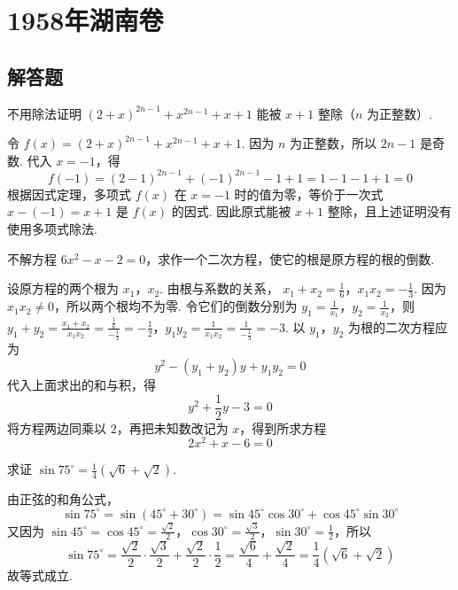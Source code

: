 \chapter{1958年湖南卷}

\section{解答题}

\begin{problem}
不用除法证明 \(\left(2+x\right)^{2n-1}+x^{2n-1}+x+1\) 能被 \(x+1\) 整除（\(n\) 为正整数）.
\end{problem}

\begin{solution}
令 \(f(x)=\left(2+x\right)^{2n-1}+x^{2n-1}+x+1\). 因为 \(n\) 为正整数，所以 \(2n-1\) 是奇数. 代入 \(x=-1\)，得
\[
f(-1)=\left(2-1\right)^{2n-1}+\left(-1\right)^{2n-1}-1+1=1-1-1+1=0
\]
根据因式定理，多项式 \(f(x)\) 在 \(x=-1\) 时的值为零，等价于一次式 \(x-(-1)=x+1\) 是 \(f(x)\) 的因式. 因此原式能被 \(x+1\) 整除，且上述证明没有使用多项式除法.
\end{solution}

\begin{problem}
不解方程 \(6x^{2}-x-2=0\)，求作一个二次方程，使它的根是原方程的根的倒数.
\end{problem}

\begin{solution}
设原方程的两个根为 \(x_{1}\)，\(x_{2}\). 由根与系数的关系，
\(x_{1}+x_{2}=\frac{1}{6}\)，\(x_{1}x_{2}=-\frac{1}{3}\).
因为 \(x_{1}x_{2}\ne0\)，所以两个根均不为零. 令它们的倒数分别为 \(y_{1}=\frac{1}{x_{1}}\)，\(y_{2}=\frac{1}{x_{2}}\)，则
\(y_{1}+y_{2}=\frac{x_{1}+x_{2}}{x_{1}x_{2}}=\frac{\frac{1}{6}}{-\frac{1}{3}}=-\frac{1}{2}\)，\(y_{1}y_{2}=\frac{1}{x_{1}x_{2}}=\frac{1}{-\frac{1}{3}}=-3\).
以 \(y_{1}\)，\(y_{2}\) 为根的二次方程应为
\[
y^{2}-\left(y_{1}+y_{2}\right)y+y_{1}y_{2}=0
\]
代入上面求出的和与积，得
\[
y^{2}+\frac{1}{2}y-3=0
\]
将方程两边同乘以 \(2\)，再把未知数改记为 \(x\)，得到所求方程
\[
2x^{2}+x-6=0
\]
\end{solution}

\begin{problem}
求证 \(\sin75^{\circ}=\frac{1}{4}\left(\sqrt{6}+\sqrt{2}\right)\).
\end{problem}

\begin{solution}
由正弦的和角公式，
\[
\sin75^{\circ}=\sin\left(45^{\circ}+30^{\circ}\right)=\sin45^{\circ}\cos30^{\circ}+\cos45^{\circ}\sin30^{\circ}
\]
又因为 \(\sin45^{\circ}=\cos45^{\circ}=\frac{\sqrt{2}}{2}\)，\(\cos30^{\circ}=\frac{\sqrt{3}}{2}\)，\(\sin30^{\circ}=\frac{1}{2}\)，所以
\[
\sin75^{\circ}=\frac{\sqrt{2}}{2}\cdot\frac{\sqrt{3}}{2}+\frac{\sqrt{2}}{2}\cdot\frac{1}{2}=\frac{\sqrt{6}}{4}+\frac{\sqrt{2}}{4}=\frac{1}{4}\left(\sqrt{6}+\sqrt{2}\right)
\]
故等式成立.
\end{solution}

